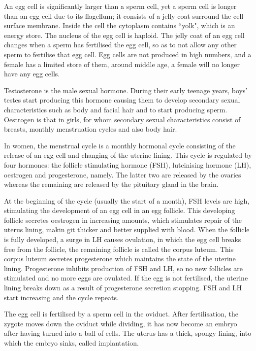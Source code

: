 An egg cell is significantly larger than a sperm cell, yet a sperm cell is longer than an egg
cell due to its flagellum; it consists of a jelly coat surround the
cell surface membrane. Inside the cell the cytoplasm contains ``yolk", which is an energy store.
The nucleus of the egg cell is haploid. The jelly coat of an egg cell changes when a sperm has
fertilised the egg cell, so as to not allow any other sperm to fertilise that egg cell. Egg cells
are not produced in high numbers, and a female has a limited store of them, around middle age, a
female will no longer have any egg cells.

Testosterone is the male sexual hormone. During their early teenage years, boys' testes start
producing this hormone causing them to develop secondary sexual characteristics such as body and
facial hair and to start producing sperm. Oestrogen is that in girls, for whom secondary sexual
characteristics consist of breasts, monthly menstruation cycles and also body hair.

In women, the menstrual cycle is a monthly hormonal cycle consisting of the release of an egg
cell and changing of the uterine lining. This cycle is regulated by four hormones: the follicle
stimulating hormone (FSH), luteinising hormone (LH), oestrogen and progesterone, namely. The latter
two are released by the ovaries whereas the remaining are released by the pituitary gland in the
brain.

At the
beginning of the cycle (usually the start of a month), FSH levels are high, stimulating the 
development of an egg cell in an egg follicle. This developing follicle secretes oestrogen in
increasing amounts, which stimulates repair of the uterus lining, makin git thicker and better
supplied with blood. When the follicle is fully developed, a surge in LH causes ovulation, in which
the egg cell breaks free from the follicle, the remaining follicle is called the corpus luteum. 
This corpus luteum secretes progesterone which maintains the state of the uterine lining. 
Progesterone inhibits production of FSH and LH, so no new follicles are stimulated and no more
eggs are ovulated. If the egg is not fertilised, the uterine lining breaks down as a result of
progesterone secretion stopping. FSH and LH start increasing and the cycle repeats.

The egg cell is fertilised by a sperm cell in the oviduct. After fertilisation, the zygote moves
down the oviduct while dividing, it has now become an embryo after having turned into a ball of 
cells. The uterus has a thick, spongy lining, into which the embryo sinks, called implantation.

